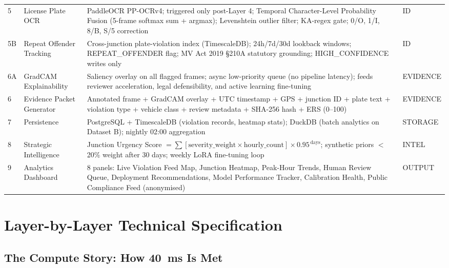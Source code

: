 \documentclass[11pt,a4paper]{article}
\begin{document}
\begin{longtable}{C{1.2cm} L{3cm} L{6.8cm} L{2.5cm}}
    5 & License Plate OCR & PaddleOCR PP-OCRv4; triggered only post-Layer 4; Temporal Character-Level Probability Fusion (5-frame softmax sum + argmax); Levenshtein outlier filter; KA-regex gate; 0/O, 1/I, 8/B, S/5 correction & ID \\
    5B & Repeat Offender Tracking & Cross-junction plate-violation index (TimescaleDB); 24h/7d/30d lookback windows; REPEAT\_OFFENDER flag; MV Act 2019 \S210A statutory grounding; HIGH\_CONFIDENCE writes only & ID \\
    6A & GradCAM Explainability & Saliency overlay on all flagged frames; async low-priority queue (no pipeline latency); feeds reviewer acceleration, legal defensibility, and active learning fine-tuning & EVIDENCE \\
    6 & Evidence Packet Generator & Annotated frame + GradCAM overlay + UTC timestamp + GPS + junction ID + plate text + violation type + vehicle class + review metadata + SHA-256 hash + ERS (0--100) & EVIDENCE \\
    7 & Persistence & PostgreSQL + TimescaleDB (violation records, heatmap stats); DuckDB (batch analytics on Dataset B); nightly 02:00 aggregation & STORAGE \\
    8 & Strategic Intelligence & Junction Urgency Score $= \sum[\text{severity\_weight} \times \text{hourly\_count}] \times 0.95^{\,\text{days}}$; synthetic priors $<$20\% weight after 30 days; weekly LoRA fine-tuning loop & INTEL \\
    9 & Analytics Dashboard & 8 panels: Live Violation Feed Map, Junction Heatmap, Peak-Hour Trends, Human Review Queue, Deployment Recommendations, Model Performance Tracker, Calibration Health, Public Compliance Feed (anonymised) & OUTPUT \\
\end{longtable}

\section{Layer-by-Layer Technical Specification}

\subsection*{The Compute Story: How 40~ms Is Met}
\end{document}
